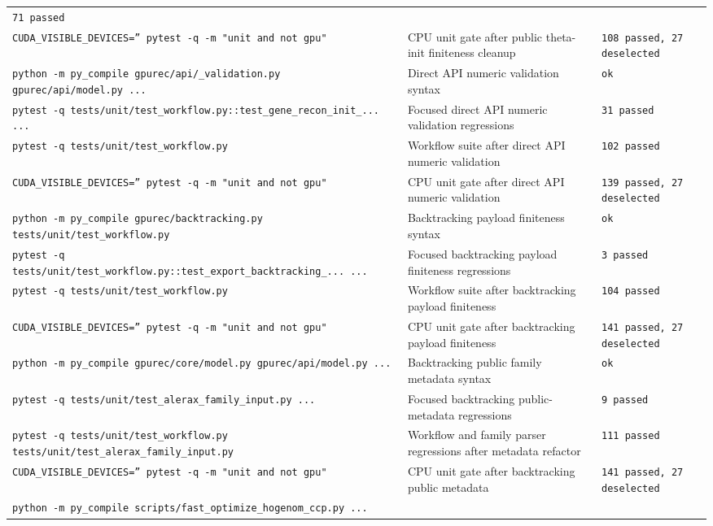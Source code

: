 \documentclass[11pt]{article}
\begin{document}
\begin{center}
\begin{tabular}{lll}
\texttt{71 passed} \\
\texttt{CUDA\_VISIBLE\_DEVICES='' pytest -q -m "unit and not gpu"} &
CPU unit gate after public theta-init finiteness cleanup &
\texttt{108 passed, 27 deselected} \\
\texttt{python -m py\_compile gpurec/api/\_validation.py gpurec/api/model.py ...} &
Direct API numeric validation syntax &
\texttt{ok} \\
\texttt{pytest -q tests/unit/test\_workflow.py::test\_gene\_recon\_init\_... ...} &
Focused direct API numeric validation regressions &
\texttt{31 passed} \\
\texttt{pytest -q tests/unit/test\_workflow.py} &
Workflow suite after direct API numeric validation &
\texttt{102 passed} \\
\texttt{CUDA\_VISIBLE\_DEVICES='' pytest -q -m "unit and not gpu"} &
CPU unit gate after direct API numeric validation &
\texttt{139 passed, 27 deselected} \\
\texttt{python -m py\_compile gpurec/backtracking.py tests/unit/test\_workflow.py} &
Backtracking payload finiteness syntax &
\texttt{ok} \\
\texttt{pytest -q tests/unit/test\_workflow.py::test\_export\_backtracking\_... ...} &
Focused backtracking payload finiteness regressions &
\texttt{3 passed} \\
\texttt{pytest -q tests/unit/test\_workflow.py} &
Workflow suite after backtracking payload finiteness &
\texttt{104 passed} \\
\texttt{CUDA\_VISIBLE\_DEVICES='' pytest -q -m "unit and not gpu"} &
CPU unit gate after backtracking payload finiteness &
\texttt{141 passed, 27 deselected} \\
\texttt{python -m py\_compile gpurec/core/model.py gpurec/api/model.py ...} &
Backtracking public family metadata syntax &
\texttt{ok} \\
\texttt{pytest -q tests/unit/test\_alerax\_family\_input.py ...} &
Focused backtracking public-metadata regressions &
\texttt{9 passed} \\
\texttt{pytest -q tests/unit/test\_workflow.py tests/unit/test\_alerax\_family\_input.py} &
Workflow and family parser regressions after metadata refactor &
\texttt{111 passed} \\
\texttt{CUDA\_VISIBLE\_DEVICES='' pytest -q -m "unit and not gpu"} &
CPU unit gate after backtracking public metadata &
\texttt{141 passed, 27 deselected} \\
\texttt{python -m py\_compile scripts/fast\_optimize\_hogenom\_ccp.py ...} &

\end{tabular}
\end{center}
\end{document}
